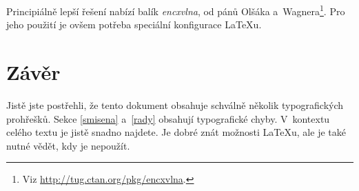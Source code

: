 \documentclass[a4paper, 10pt, twocolumn]{article}[26.02.2012]
\begin{document}
Principiálně lepší řešení nabízí balík \emph{encxvlna}, od pánů Olšáka
a~Wagnera\footnote{Viz \url{http://tug.ctan.org/pkg/encxvlna}.}.
Pro jeho použití je ovšem potřeba speciální konfigurace \LaTeX u.
\section{Závěr}\label{zaver}
Jistě jste postřehli, že tento dokument obsahuje schválně několik typografických prohřešků.
Sekce \ref{smisena} a~\ref{rady} obsahují typografické chyby. V~kontextu celého textu je jistě snadno najdete.
Je dobré znát možnosti \LaTeX u, ale je také nutné vědět, kdy je nepoužít.
\end{document}

